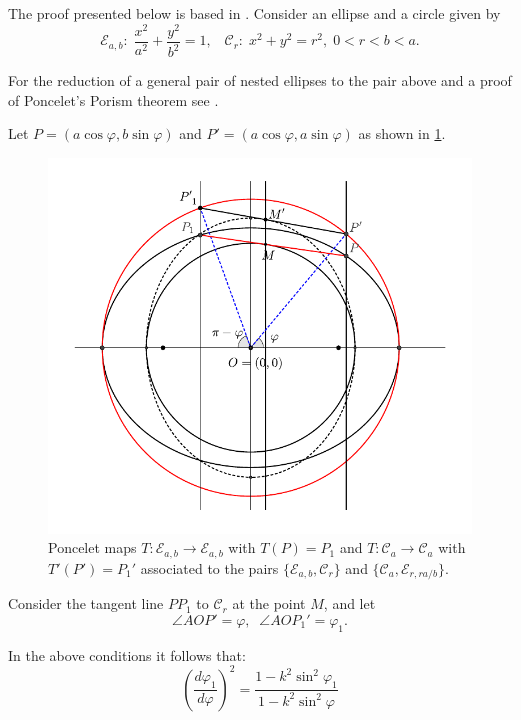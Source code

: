 The proof presented below  is based in \cite{shoe1983}. 
Consider an ellipse and a circle given by
\[\mathcal{E}_{a,b}: \;\frac{x^2}{a^2}+\frac{y^2}{b^2}=1, \;\;\; \mathcal{C}_r:\; x^2+y^2=r^2, \; 0<r<b<a.\]

For the reduction of a general pair of nested ellipses to the pair above and a proof of Poncelet's Porism theorem   see \cite{bry}.

Let $P=(a\cos\varphi, b\sin\varphi)$ and $P'=(a\cos\varphi, a\sin\varphi)$ as shown in   \cref{fig:ec}.
\begin{figure}[H]
	\begin{center}
		 \includegraphics[angle=0, width=12cm]{chap_02/pics/pics_chap2-010-poncelet-proof.pdf}
		\caption { Poncelet maps $T:\mathcal{E}_{a,b}\to\mathcal{E}_{a,b}$ with $T(P)=P_1$ and $T:\mathcal{C}_{a}\to\mathcal{C}_{a}$ with $T'(P')=P_1'$ associated to  the pairs $\{\mathcal{E}_{a,b},\mathcal{C}_r\}$ and $\{\mathcal{C}_a,\mathcal{E}_{r,ra/b}\}$. \label{fig:ec}}
	\end{center}
\end{figure}
Consider the tangent line $PP_1$ to $\mathcal{C}_r$ at the point $M$, and let
\[\angle AOP'=\varphi, \;\; \angle AOP_1'=\varphi_1.\]
\begin{proposition} In the above conditions it follows that:
    \begin{equation}
        \left(\frac{d\varphi_1}{d\varphi}\right)^2=\frac{1-k^2\sin^2\varphi_1}{1-k^2\sin^2\varphi}
            \label{eq:variacaoangular}
    \end{equation}
    \label{prop:variacaoangular}
\end{proposition}
